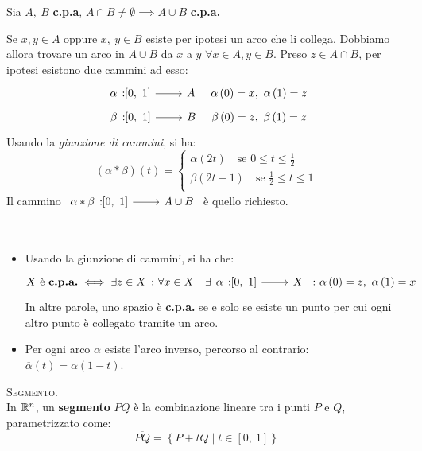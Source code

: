 \begin{lemming}
	Sia $A,\ B$ \textbf{c.p.a}, $A\cap B\neq \emptyset\implies A\cup B$ \textbf{c.p.a.}
\end{lemming}
\begin{demonstration}
	Se $x, y\in A$ oppure $x,\ y\in B$ esiste per ipotesi un arco che li collega. Dobbiamo allora trovare un arco in $A\cup B$ da $x$ a $y$ $\forall x\in A, y\in B$. Preso $z\in A\cap B$, per ipotesi esistono due cammini ad esso:
	\begin{gather*}
		\funz{\alpha}{\left[0,\ 1\right]}{A}\quad \alpha\left(0\right)=x,\ \alpha\left(1\right)=z\\
		\funz{\beta}{\left[0,\ 1\right]}{B}\quad \beta\left(0\right)=z,\ \beta\left(1\right)=z	
	\end{gather*}
	Usando la \textit{giunzione di cammini}, si ha:
	\begin{equation}
		\left(\alpha\ast\beta\right)\left(t\right)=\begin{cases}
			\alpha\left(2t\right)\quad\text{se }0\leq t\leq \frac{1}{2}\\
			\beta\left(2t-1\right)\quad\text{se }\frac{1}{2}\leq t\leq 1\\	
		\end{cases}
	\end{equation}
	Il cammino $\funz{\alpha\ast\beta}{\left[0,\ 1\right]}{A\cup B}$ è quello richiesto.
\end{demonstration}
\begin{observes}~{}\label{giunzionecpa}
	\begin{itemize}
		\item Usando la giunzione di cammini, si ha che:
		\begin{equation*}
			X\text{ è \textbf{c.p.a.}}\iff \exists z\in X\ \colon \forall x\in X\quad
			\exists \funz{\alpha}{\left[0,\ 1\right]}{X}\ \colon \alpha\left(0\right)=z,\ \alpha\left(1\right)=x
		\end{equation*}
		In altre parole, uno spazio è \textbf{c.p.a.} se e solo se esiste un punto per cui ogni altro punto è collegato tramite un arco.
		\item Per ogni arco $\alpha$ esiste l'arco inverso, percorso al contrario: $\overline{\alpha}\left(t\right)=\alpha\left(1-t\right)$.
	\end{itemize}
\vspace{-3mm}
\end{observes}
\begin{define}\textsc{Segmento.}\label{segmento}\\
	In $\mathbb{R}^n$, un \textbf{segmento} $\overline{PQ}$ è la combinazione lineare tra i punti $P$ e $Q$, parametrizzato come:
	\begin{equation}
		\overline{PQ}=\left\{P+tQ\mid t\in\left[0,\ 1\right]\right\}
	\end{equation}
\vspace{-6mm}
\end{define}
